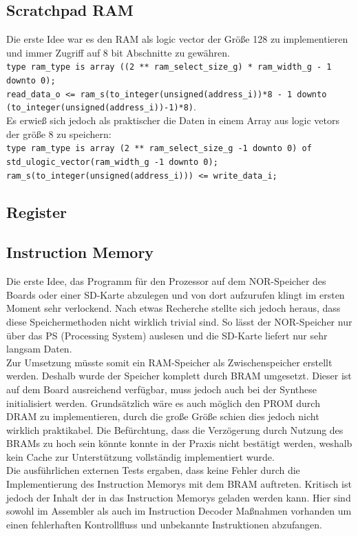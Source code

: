 \documentclass{scrartcl}
\begin{document}
\subsection{Scratchpad RAM}
Die erste Idee war es den RAM als logic vector der Größe 128 zu implementieren und immer Zugriff auf 8 bit Abschnitte zu gewähren.\\
\lstinline{type ram_type is array ((2 ** ram_select_size_g) * ram_width_g - 1 downto 0);}\\
\lstinline{read_data_o <= ram_s(to_integer(unsigned(address_i))*8 - 1 downto (to_integer(unsigned(address_i))-1)*8)}.\\
Es erwieß sich jedoch als praktischer die Daten in einem Array aus logic vetors der größe 8 zu speichern:\\
\lstinline{type ram_type is array (2 ** ram_select_size_g -1 downto 0) of std_ulogic_vector(ram_width_g -1 downto 0);}\\
\lstinline{ram_s(to_integer(unsigned(address_i))) <= write_data_i;}\\

\subsection{Register}

\subsection{Instruction Memory}
Die erste Idee, das Programm für den Prozessor auf dem NOR-Speicher des Boards oder einer SD-Karte abzulegen und von dort aufzurufen klingt im ersten Moment sehr verlockend. Nach etwas Recherche stellte sich jedoch heraus, dass diese Speichermethoden nicht wirklich trivial sind. So lässt der NOR-Speicher nur über das PS (Processing System) auslesen und die SD-Karte liefert nur sehr langsam Daten. \\
Zur Umsetzung müsste somit ein RAM-Speicher als Zwischenspeicher erstellt werden. Deshalb wurde der Speicher komplett durch BRAM umgesetzt. Dieser ist auf dem Board ausreichend verfügbar, muss jedoch auch bei der Synthese initialisiert werden. Grundsätzlich wäre es auch möglich den PROM durch DRAM zu implementieren, durch die große Größe schien dies jedoch nicht wirklich praktikabel. Die Befürchtung, dass die Verzögerung durch Nutzung des BRAMs zu hoch sein könnte konnte in der Praxis nicht bestätigt werden, weshalb kein Cache zur Unterstützung vollständig implementiert wurde. \\
Die ausführlichen externen Tests ergaben, dass keine Fehler durch die Implementierung des Instruction Memorys mit dem BRAM auftreten. Kritisch ist jedoch der Inhalt der in das Instruction Memorys geladen werden kann. Hier sind sowohl im Assembler als auch im Instruction Decoder Maßnahmen vorhanden um einen fehlerhaften Kontrollfluss und unbekannte Instruktionen abzufangen. 
\end{document}
